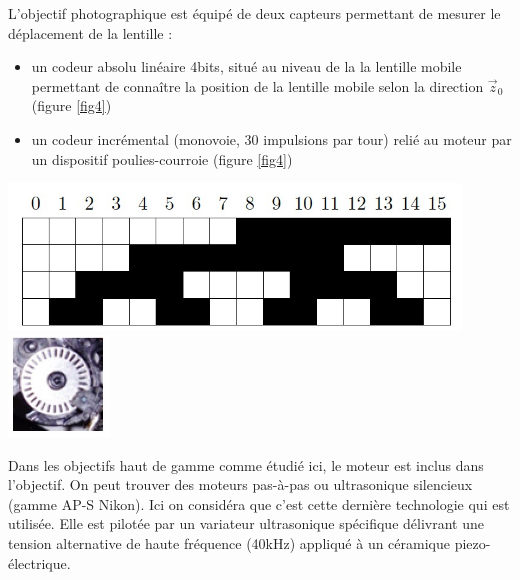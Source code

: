 \begin{minipage}{0.4\textwidth}
L'objectif photographique est équipé de deux capteurs permettant de
mesurer le déplacement de la lentille :
\begin{itemize}
\item un codeur absolu linéaire 4bits, situé au niveau de la la lentille mobile permettant de connaître la position de la lentille mobile selon la direction $\overrightarrow{z}_0$ (figure \ref{fig4})
\item un codeur incrémental (monovoie, 30 impulsions par tour) relié au moteur par un dispositif poulies-courroie (figure \ref{fig4})
\end{itemize}
\end{minipage}
\begin{minipage}{0.6\textwidth}
\begin{center}
\includegraphics[width=0.9\textwidth]{images/absolu.jpg}\\
\includegraphics[width=0.2\textwidth]{images/relatif.jpg}
\end{center}
\end{minipage}

Dans les objectifs haut de gamme comme étudié ici, le moteur est inclus dans l'objectif. On peut trouver des moteurs pas-à-pas ou ultrasonique silencieux (gamme AP-S Nikon). Ici on considéra que c'est cette dernière technologie qui est utilisée. Elle est pilotée par un variateur ultrasonique spécifique délivrant une tension alternative de haute fréquence (40kHz) appliqué à un céramique piezo-électrique.





